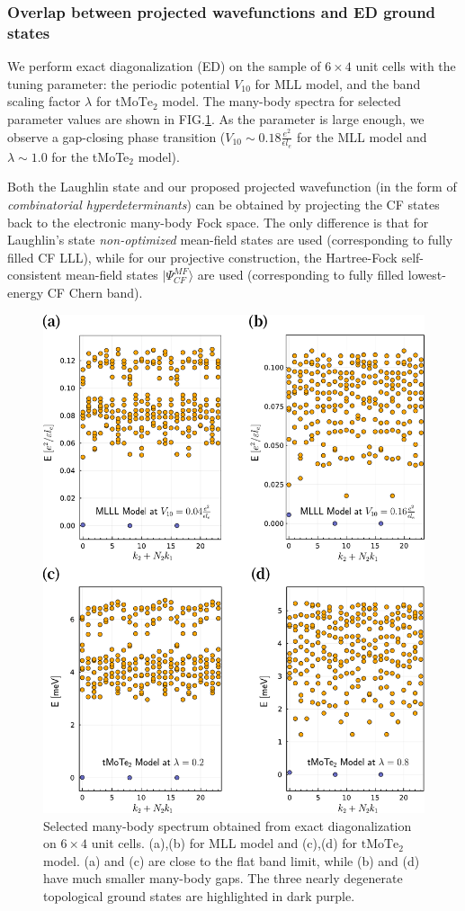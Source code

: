 \subsubsection{Overlap between projected wavefunctions and ED ground states}
We perform exact diagonalization (ED) on the sample of $6\times4$ unit cells with the tuning parameter: the periodic potential $V_{10}$ for MLL model, and the band scaling factor $\lambda$ for $\mathrm{tMoTe_2}$ model. The many-body spectra for selected parameter values are shown in FIG.\ref{fig: ED}. As the parameter is large enough, we observe a gap-closing phase transition ($V_{10}\sim 0.18\frac{e^2}{\epsilon l_e}$ for the MLL model and $\lambda\sim 1.0$ for the tMoTe$_2$ model).

Both the Laughlin state and our proposed projected wavefunction (in the form of \emph{combinatorial hyperdeterminants}) can be obtained by projecting the CF states back to the electronic many-body Fock space. The only difference is that for Laughlin's state \emph{non-optimized} mean-field states are used (corresponding to fully filled CF LLL), while for our projective construction, the Hartree-Fock self-consistent mean-field states $|\Psi^{MF}_{CF}\rangle$ are used (corresponding to fully filled lowest-energy CF Chern band). 
\begin{figure}
    \centering
    \includegraphics[width=0.9\linewidth]{contents/FCI_ProjWfc/figures/combined_ED.pdf}
    \caption{Selected many-body spectrum obtained from exact diagonalization on $6\times4$ unit cells. (a),(b) for MLL model and (c),(d) for $\mathrm{tMoTe_2}$ model. (a) and (c) are close to the flat band limit, while (b) and (d) have much smaller many-body gaps. The three nearly degenerate topological ground states are highlighted in dark purple.}
    \label{fig: ED}
\end{figure}



